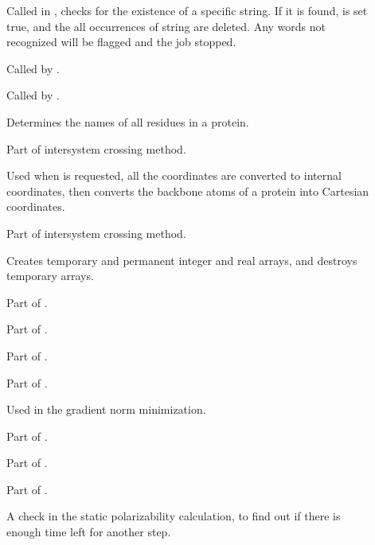\begin{description}
\item[] Called in ,  checks for  the
existence of a specific string. If it is found,  is set true, and
the all occurrences of string are deleted. Any words not recognized will be
flagged and the job stopped.

\item[] Called by .

\item[] Called by .

\item[] Determines the names of all residues in a protein.

\item[] Part of intersystem crossing method.

\item[] Used when  is requested, all the coordinates
are converted to internal coordinates, then  converts the backbone
atoms of a protein into Cartesian coordinates.

\item[] Part of intersystem crossing method.

\item[] Creates temporary and permanent integer and real arrays,
and destroys temporary arrays.

\item[] Part of .

\item[] Part of .

\item[] Part of .

\item[] Part of .

\item[] Used in the gradient norm minimization.

\item[] Part of .

\item[] Part of .

\item[] Part of .

\item[] A check in the static polarizability calculation, to find
out if there is enough time left for another step.


\end{description}
